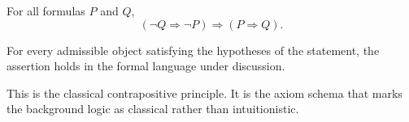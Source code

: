 \NoLocalDependencies

\begin{axiombox}{}
\begin{axiom}
\label{ax:propositional-classical-contraposition}
For all formulas $P$ and $Q$,
\[
(\neg Q \Longrightarrow \neg P) \Longrightarrow (P \Longrightarrow Q).
\]
\end{axiom}
\end{axiombox}
\begin{remark*}
For every admissible object satisfying the hypotheses of the statement, the
assertion holds in the formal language under discussion.
\end{remark*}


\begin{remark*}[Interpretation]
This is the classical contrapositive principle. It is the axiom schema that
marks the background logic as classical rather than intuitionistic.
\end{remark*}

\NoLocalDependencies
